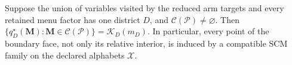 Suppose the union of variables visited by the reduced arm targets and every retained menu factor has one district \(D\), and \(\mathcal C(\mathcal P)\ne\varnothing\). Then \(\{q_D^\star(\mathbf M):\mathbf M\in\mathcal C(\mathcal P)\}=\mathcal K_D(m_D)\). In particular, every point of the boundary face, not only its relative interior, is induced by a compatible SCM family on the declared alphabets \(\mathcal X\).